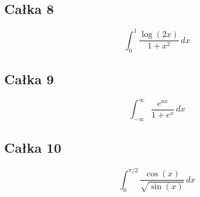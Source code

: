 \documentclass{article}
\begin{document}
\subsection*{Całka 8}
\begin{equation}
    \int_{0}^{1} \frac{\log(2x)}{1+x^2} \,dx
\end{equation}

\subsection*{Całka 9}
\begin{equation}
    \int_{-\infty}^{\infty} \frac{e^{ax}}{1+e^x} \,dx
\end{equation}

\subsection*{Całka 10}
\begin{equation}
    \int_{0}^{\pi/2} \frac{\cos(x)}{\sqrt{\sin(x)}} \,dx
\end{equation}
\end{document}
